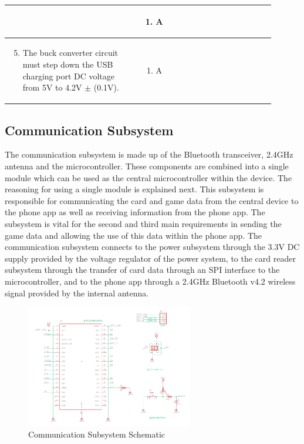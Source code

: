 \documentclass[12pt]{article}
\begin{document}
\begin{table}[!h]
\begin{tabular}{| p{0.45\linewidth} | p{0.45\linewidth} |}
\begin{enumerate}
		\end{enumerate} & \begin{enumerate}[label=\alph*)]
 			\item A
		\end{enumerate} \\
		\hline
		\begin{enumerate}
		\setcounter{enumi}{4}
 			\item The buck converter circuit must step down the USB charging port DC voltage from 5V to 4.2V $\pm$ (0.1V).
		\end{enumerate} & \begin{enumerate}[label=\alph*)]
 			\item A
		\end{enumerate} \\
		\hline
	\end{tabular}
\end{table}

\subsection{Communication Subsystem}

The communication subsystem is made up of the Bluetooth transceiver, 2.4GHz antenna and the microcontroller. These components are combined into a single module which can be used as the central microcontroller within the device. The reasoning for using a single module is explained next. This subsystem is responsible for communicating the card and game data from the central device to the phone app as well as receiving information from the phone app. The subsystem is vital for the second and third main requirements in sending the game data and allowing the use of this data within the phone app. The communication subsystem connects to the power subsystem through the 3.3V DC supply provided by the voltage regulator of the power system, to the card reader subsystem through the transfer of card data through an SPI interface to the microcontroller, and to the phone app through a 2.4GHz Bluetooth v4.2 wireless signal provided by the internal antenna.

\begin{figure}[h!]
	\centering
	\includegraphics[width=0.65\textwidth]{Comms_Schem.png}
	\caption{Communication Subsystem Schematic}
	\label{fig:comm_schem}
\end{figure}
\end{document}
